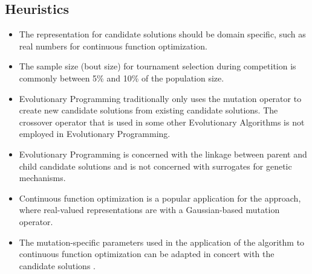\subsection{Heuristics}
\begin{itemize}
	\item The representation for candidate solutions should be domain specific, such as real numbers for continuous function optimization.
	\item The sample size (bout size) for tournament selection during competition is commonly between 5\% and 10\% of the population size.
	\item Evolutionary Programming traditionally only uses the mutation operator to create new candidate solutions from existing candidate solutions. The crossover operator that is used in some other Evolutionary Algorithms is not employed in Evolutionary Programming.
	\item Evolutionary Programming is concerned with the linkage between parent and child candidate solutions and is not concerned with surrogates for genetic mechanisms.
	\item Continuous function optimization is a popular application for the approach, where real-valued representations are with a Gaussian-based mutation operator.
	\item The mutation-specific parameters used in the application of the algorithm to continuous function optimization can be adapted in concert with the candidate solutions \cite{Fogel1991a}.
\end{itemize}

